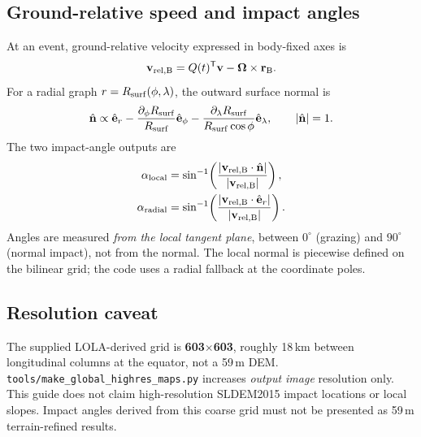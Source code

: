 \documentclass[11pt,a4paper]{article}
\newcommand{\pathcode}[1]{\nolinkurl{#1}}
\begin{document}
\subsection{Ground-relative speed and impact angles}
At an event, ground-relative velocity expressed in body-fixed axes is
\begin{equation}
\mathbf v_{\rm rel,B}=Q(t)^{\mathsf T}\mathbf v-
\boldsymbol\Omega\times\mathbf r_{\rm B}.
\end{equation}
For a radial graph \(r=R_{\rm surf}(\phi,\lambda)\), the outward surface normal is
\begin{equation}
\hat{\mathbf n}\propto \hat{\mathbf e}_r-
{\partial_\phi R_{\rm surf}\over R_{\rm surf}}\hat{\mathbf e}_{\phi}
-{\partial_\lambda R_{\rm surf}\over R_{\rm surf}\cos\phi}\hat{\mathbf e}_{\lambda},
\qquad |\hat{\mathbf n}|=1.
\end{equation}
The two impact-angle outputs are
\begin{align}
\alpha_{\rm local}&=\sin^{-1}\!\left({|\mathbf v_{\rm rel,B}\cdot\hat{\mathbf n}|\over|\mathbf v_{\rm rel,B}|}\right),\\
\alpha_{\rm radial}&=\sin^{-1}\!\left({|\mathbf v_{\rm rel,B}\cdot\hat{\mathbf e}_r|\over|\mathbf v_{\rm rel,B}|}\right).
\end{align}
Angles are measured \emph{from the local tangent plane}, between \(0^\circ\) (grazing) and \(90^\circ\) (normal impact), not from the normal. The local normal is piecewise defined on the bilinear grid; the code uses a radial fallback at the coordinate poles.

\subsection{Resolution caveat}
The supplied LOLA-derived grid is \textbf{603\(\times\)603}, roughly 18\,km between longitudinal columns at the equator, not a 59\,m DEM. \pathcode{tools/make_global_highres_maps.py} increases \emph{output image} resolution only. This guide does not claim high-resolution SLDEM2015 impact locations or local slopes. Impact angles derived from this coarse grid must not be presented as 59\,m terrain-refined results.
\end{document}
